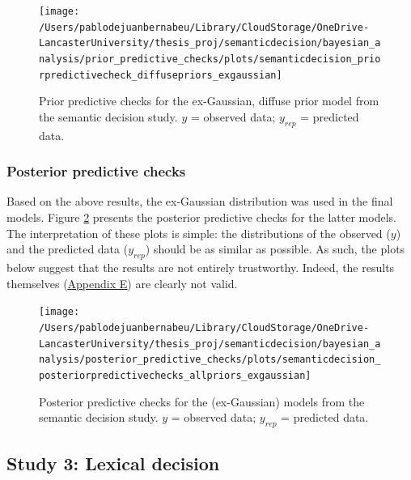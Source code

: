\documentclass[
  12pt,
  man,floatsintext]{apa7}
\begin{document}
\begin{figure}

{\centering \texttt{[image: /Users/pablodejuanbernabeu/Library/CloudStorage/OneDrive-LancasterUniversity/thesis\_proj/semanticdecision/bayesian\_analysis/prior\_predictive\_checks/plots/semanticdecision\_priorpredictivecheck\_diffusepriors\_exgaussian]} 

}

\caption{Prior predictive checks for the ex-Gaussian, diffuse prior model from the semantic decision study. \(y\) = observed data; \(y_{rep}\) = predicted data.}\label{fig:semanticdecision-priorpredictivecheck-diffusepriors-exgaussian}
\end{figure}

\hypertarget{posterior-predictive-checks-1}{%
\subsubsection{Posterior predictive checks}\label{posterior-predictive-checks-1}}

Based on the above results, the ex-Gaussian distribution was used in the final models. Figure \ref{fig:semanticdecision-posteriorpredictivechecks-allpriors-exgaussian} presents the posterior predictive checks for the latter models. The interpretation of these plots is simple: the distributions of the observed (\(y\)) and the predicted data (\(y_{rep}\)) should be as similar as possible. As such, the plots below suggest that the results are not entirely trustworthy. Indeed, the results themselves (\protect\hyperlink{appendix-E-Bayesian-analysis-results}{\underline{Appendix E}}) are clearly not valid.



\begin{figure}

{\centering \texttt{[image: /Users/pablodejuanbernabeu/Library/CloudStorage/OneDrive-LancasterUniversity/thesis\_proj/semanticdecision/bayesian\_analysis/posterior\_predictive\_checks/plots/semanticdecision\_posteriorpredictivechecks\_allpriors\_exgaussian]} 

}

\caption{Posterior predictive checks for the (ex-Gaussian) models from the semantic decision study. \(y\) = observed data; \(y_{rep}\) = predicted data.}\label{fig:semanticdecision-posteriorpredictivechecks-allpriors-exgaussian}
\end{figure}

\hypertarget{study-3-lexical-decision-2}{%
\subsection{Study 3: Lexical decision}\label{study-3-lexical-decision-2}}
\end{document}
